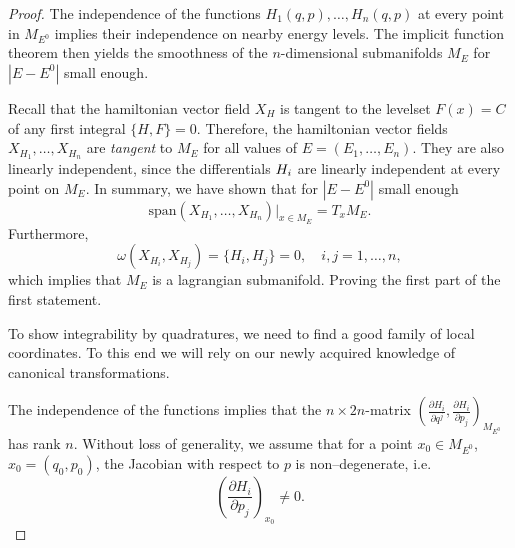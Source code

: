 \documentclass[english,fontsize=11pt,paper=a5,oneside]{scrbook}
\let\d\relax
\DeclareMathOperator{\d}{d}
\theoremstyle{definition}
\begin{document}
\begin{proof}
    The independence of the functions $H_1(q,p), \ldots, H_n(q,p)$ at every point in $M_{E^0}$ implies their independence on nearby energy levels. The implicit function theorem then yields the smoothness of the $n$-dimensional submanifolds $M_E$ for $|E-E^0|$ small enough.

    Recall that the hamiltonian vector field $X_H$ is tangent to the levelset $F(x)=C$ of any first integral $\big\{H,F\big\} = 0$. Therefore, the hamiltonian vector fields $X_{H_1}, \ldots, X_{H_n}$ are \emph{tangent} to $M_E$ for all values of $E=(E_1,\ldots, E_n)$.
    They are also linearly independent, since the differentials $\d H_i$ are linearly independent at every point on $M_E$.
    In summary, we have shown that for $|E-E^0|$ small enough
    \begin{equation}
        \mathrm{span}(X_{H_1}, \ldots, X_{H_n}) \big|_{x\in M_E} = T_x M_E.
    \end{equation}
    Furthermore,
    \begin{equation}
        \omega(X_{H_i}, X_{H_j}) = \big\{H_i, H_j\big\} =0, \quad i,j=1,\ldots,n,
    \end{equation}
    which implies that $M_E$ is a lagrangian submanifold. Proving the first part of the first statement.

    To show integrability by quadratures, we need to find a good family of local coordinates. To this end we will rely on our newly acquired knowledge of canonical transformations.

    The independence of the functions implies that the $n\times 2n$-matrix
    $\left(
        \frac{\partial H_i}{\partial q^j},
        \frac{\partial H_i}{\partial p_j}
    \right)_{M_{E^0}}$
    has rank $n$. Without loss of generality, we assume that for a point $x_0 \in M_{E^0}$, $x_0 =(q_0,p_0)$, the Jacobian with respect to $p$ is non--degenerate, i.e.
    \begin{equation}\label{eq:nondegHip}
        \left(
        \frac{\partial H_i}{\partial p_j}
        \right)_{x_0} \neq 0.
    \end{equation}
    

\end{proof}
\end{document}
